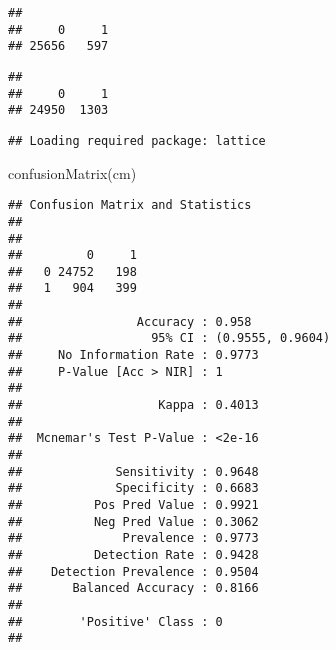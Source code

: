 \documentclass[
]{article}
\newenvironment{Shaded}{\begin{snugshade}}{\end{snugshade}}
\newcommand{\FunctionTok}[1]{\textcolor[rgb]{0.00,0.00,0.00}{#1}}
\newcommand{\NormalTok}[1]{#1}
\newcommand{\OtherTok}[1]{\textcolor[rgb]{0.56,0.35,0.01}{#1}}
\newcommand{\SpecialCharTok}[1]{\textcolor[rgb]{0.00,0.00,0.00}{#1}}
\begin{document}
\begin{verbatim}
## 
##     0     1 
## 25656   597
\end{verbatim}

\begin{Shaded}
\end{Shaded}

\begin{verbatim}
## 
##     0     1 
## 24950  1303
\end{verbatim}

\begin{Shaded}
\end{Shaded}

\begin{verbatim}
## Loading required package: lattice
\end{verbatim}

\begin{Shaded}
\begin{Highlighting}[]
\FunctionTok{confusionMatrix}\NormalTok{(cm)}
\end{Highlighting}
\end{Shaded}

\begin{verbatim}
## Confusion Matrix and Statistics
## 
##    
##         0     1
##   0 24752   198
##   1   904   399
##                                           
##                Accuracy : 0.958           
##                  95% CI : (0.9555, 0.9604)
##     No Information Rate : 0.9773          
##     P-Value [Acc > NIR] : 1               
##                                           
##                   Kappa : 0.4013          
##                                           
##  Mcnemar's Test P-Value : <2e-16          
##                                           
##             Sensitivity : 0.9648          
##             Specificity : 0.6683          
##          Pos Pred Value : 0.9921          
##          Neg Pred Value : 0.3062          
##              Prevalence : 0.9773          
##          Detection Rate : 0.9428          
##    Detection Prevalence : 0.9504          
##       Balanced Accuracy : 0.8166          
##                                           
##        'Positive' Class : 0               
## 
\end{verbatim}
\end{document}
